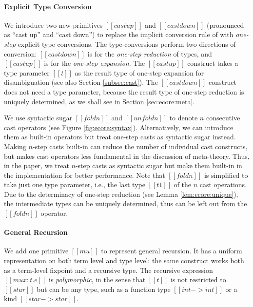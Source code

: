 \paragraph{Explicit Type Conversion}

We introduce two new primitives $[[castup]]$ and $[[castdown]]$
(pronounced as ``cast up'' and ``cast down'') to replace the implicit
conversion rule of \cc with \emph{one-step} explicit type
conversions. The type-conversions perform two directions of conversion:
$[[castdown]]$ is for the \emph{one-step reduction} of types, and
$[[castup]]$ is for the \emph{one-step expansion}. The $[[castup]]$
construct takes a
type parameter $[[t]]$ as the result type of one-step expansion
for disambiguation (see also Section \ref{subsec:cast}). The $[[castdown]]$ construct
does not need a type parameter,  because the result type of one-step reduction
is uniquely determined, as we shall see in Section \ref{sec:ecore:meta}.

We use syntactic sugar $[[foldn]]$ and $[[unfoldn]]$ to denote $n$
consecutive cast operators (see Figure
\ref{fig:ecore:syntax}). Alternatively, we can introduce them as
built-in operators but treat one-step casts as syntactic sugar
instead. Making $n$-step casts built-in can reduce the number of
individual cast constructs, but makes cast operators less fundamental
in the discussion of meta-theory. Thus, in the paper, we treat
$n$-step casts as syntactic sugar but make them built-in in the
implementation for better performance. Note that $[[foldn]]$ is
simplified to take just one type parameter, i.e., the last type
$[[t1]]$ of the $n$ cast operations. Due to the determinacy of
one-step reduction (see Lemma \ref{lem:ecore:unique}), the
intermediate types can be uniquely determined, thus can be left out
from the $[[foldn]]$ operator.

\paragraph{General Recursion}
We add one primitive $[[mu]]$ to represent general recursion.
It has a uniform representation on both term level and type level: the
same construct works both as a term-level fixpoint and a recursive type. The recursive
expression $[[mu x:t.e]]$ is \emph{polymorphic}, in the sense that $[[t]]$ 
is not restricted to $[[star]]$ but can be any type, 
such as a function type $[[int -> int]]$ or a kind $[[star -> star]]$.

